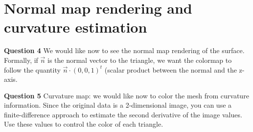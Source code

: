 \documentclass[a4paper, 11pt]{article}
\begin{document}
\section{Normal map rendering and curvature estimation}


{\bf Question 4} We would like now to see the normal map rendering of
the surface. Formally, if $\vec{n}$ is the normal vector to the
triangle, we want the colormap to follow the quantity $\vec{n}\cdot
(0,0,1)^t$ (scalar product between the normal and the z-axis.



{\bf Question 5} Curvature map: we would like now to color the mesh
from curvature information. Since the original data is a 2-dimensional
image, you can use a finite-difference approach to estimate the second
derivative of the image values. Use these values to control the color
of each triangle.
\end{document}
